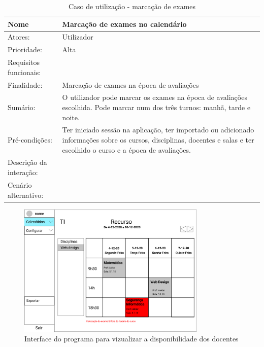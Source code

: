 \documentclass[11pt, twoside]{report}
\begin{document}
\begin{table}[H]
	\caption{Caso de utilização - marcação de exames}
	\begin{center}	
		\begin{tabularx}{\textwidth}{|l|X|}
			\hline
			\textbf{Nome }	& \textbf{Marcação de exames no calendário} \\
			\hline
			Atores: & Utilizador\\
			\hline
			Prioridade: &  Alta\\
			\hline
			Requisitos funcionais:&  \\
			\hline
			Finalidade: & Marcação de exames na época de avaliações\\
			\hline
			Sumário: & O utilizador pode marcar os exames na época de avaliações escolhida. Pode marcar num dos três turnos: manhã, tarde e noite.\\
			\hline
			Pré-condições: & Ter iniciado sessão na aplicação, ter importado ou adicionado informações sobre os cursos, disciplinas, docentes e salas e ter escolhido o curso e a época de avaliações.\\
			\hline
			Descrição da interação: &  \\
			\hline
			Cenário alternativo: &\\
			\hline
		\end{tabularx}
	\end{center}
\end{table}


	\begin{figure}[H] 
		\centering 
		\includegraphics[width=0.8\textwidth,height=0.8\textheight,keepaspectratio]{image/prototipowireframes/calendarioaviso}
		\caption{Interface do programa para vizualizar a disponibilidade dos docentes}
	\end{figure}
	
\end{document}
